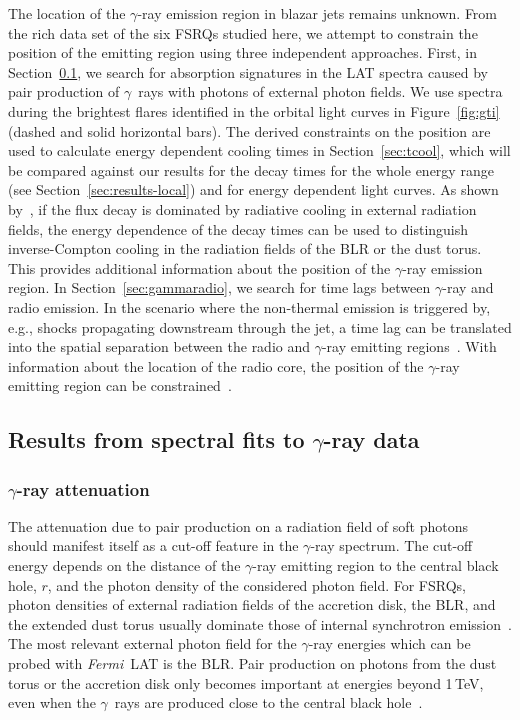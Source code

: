 \documentclass[twocolumn,linenumbers]{aastex62}
\newcommand{\Grays}{$\gamma$~rays\xspace}
\newcommand{\gray}{$\gamma$-ray\xspace}
\newcommand{\FermiLAT}{\emph{Fermi}~LAT\xspace}
\begin{document}
The location of the \gray emission region in blazar jets remains unknown. 
From the rich data set of the six FSRQs studied here, we attempt to constrain the position of the emitting region using three independent approaches. 
First, in Section~\ref{sec:blrabs}, we search for absorption signatures in the LAT spectra caused by pair production of \Grays with photons of external photon fields. We use spectra during the brightest flares identified in the orbital light curves in Figure~\ref{fig:gti} (dashed and solid horizontal bars).
The derived constraints on the position are used to calculate energy dependent cooling times in Section~\ref{sec:tcool}, which will be compared against our results for the decay times for the whole energy range (see Section~\ref{sec:results-local}) and for energy dependent light curves.
As shown by~\citet{2012ApJ...758L..15D}, if the flux decay is dominated by radiative cooling in external radiation fields, the energy dependence of the decay times can be used to distinguish inverse-Compton cooling in the radiation fields of the BLR or the dust torus.
This provides additional information about the position of the \gray emission region.
In Section~\ref{sec:gammaradio}, we search for time lags between \gray and radio emission. 
In the scenario where the non-thermal emission is triggered by, e.g., shocks propagating downstream through the jet, a time lag can be translated into the spatial separation between the radio and \gray emitting regions~\citep{2014MNRAS.445..428M}. 
With information about the location of the radio core, the position of the \gray emitting region can be constrained~\citep[e.g.,][]{2014MNRAS.441.1899F}. 

\subsection{Results from spectral fits to \gray data}
\label{sec:blrabs}
\subsubsection{\gray attenuation}
The attenuation due to pair production on a radiation field of soft photons should manifest itself as a cut-off feature in the \gray spectrum. 
The cut-off energy depends on the distance of the \gray emitting region to the central black hole, $r$, and the photon density of the considered photon field.
For FSRQs, photon densities of external radiation fields of the accretion disk, the BLR, and the extended dust torus usually dominate those of internal synchrotron emission~\citep[see,e.g.,][]{2012ApJ...758L..15D}.
The most relevant external photon field for the \gray energies which can be probed with \FermiLAT is the BLR. 
Pair production on photons from the dust torus or the accretion disk only becomes important at energies beyond 1\,TeV, even when the \Grays are produced close to the central black hole~\citep{finke2016}.
\end{document}
